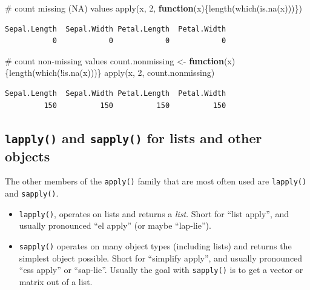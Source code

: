 \documentclass[
  13,
  letterpaper,
]{report}
\newenvironment{Shaded}{\begin{snugshade}}{\end{snugshade}}
\newcommand{\CommentTok}[1]{\textcolor[rgb]{0.37,0.37,0.37}{#1}}
\newcommand{\ControlFlowTok}[1]{\textcolor[rgb]{0.00,0.23,0.31}{\textbf{#1}}}
\newcommand{\DecValTok}[1]{\textcolor[rgb]{0.68,0.00,0.00}{#1}}
\newcommand{\FunctionTok}[1]{\textcolor[rgb]{0.28,0.35,0.67}{#1}}
\newcommand{\NormalTok}[1]{\textcolor[rgb]{0.00,0.23,0.31}{#1}}
\newcommand{\OtherTok}[1]{\textcolor[rgb]{0.00,0.23,0.31}{#1}}
\newcommand{\SpecialCharTok}[1]{\textcolor[rgb]{0.37,0.37,0.37}{#1}}
\providecommand{\tightlist}{%
  \setlength{\itemsep}{0pt}\setlength{\parskip}{0pt}}
\begin{document}
\begin{Shaded}
\begin{Highlighting}[]
\CommentTok{\# count missing (NA) values}
\FunctionTok{apply}\NormalTok{(x, }\DecValTok{2}\NormalTok{, }\ControlFlowTok{function}\NormalTok{(x)\{}\FunctionTok{length}\NormalTok{(}\FunctionTok{which}\NormalTok{(}\FunctionTok{is.na}\NormalTok{(x)))\})}
\end{Highlighting}
\end{Shaded}

\begin{verbatim}
Sepal.Length  Sepal.Width Petal.Length  Petal.Width 
           0            0            0            0 
\end{verbatim}

\begin{Shaded}
\begin{Highlighting}[]
\CommentTok{\# count non{-}missing values}
\NormalTok{count.nonmissing }\OtherTok{\textless{}{-}} \ControlFlowTok{function}\NormalTok{(x)\{}\FunctionTok{length}\NormalTok{(}\FunctionTok{which}\NormalTok{(}\SpecialCharTok{!}\FunctionTok{is.na}\NormalTok{(x)))\}}
\FunctionTok{apply}\NormalTok{(x, }\DecValTok{2}\NormalTok{, count.nonmissing)}
\end{Highlighting}
\end{Shaded}

\begin{verbatim}
Sepal.Length  Sepal.Width Petal.Length  Petal.Width 
         150          150          150          150 
\end{verbatim}

\subsection{\texorpdfstring{\texttt{lapply()} and \texttt{sapply()} for
lists and other
objects}{lapply() and sapply() for lists and other objects}}\label{lapply-and-sapply-for-lists-and-other-objects}

The other members of the \texttt{apply()} family that are most often
used are \texttt{lapply()} and \texttt{sapply()}.

\begin{itemize}
\tightlist
\item
  \texttt{lapply()}, operates on lists and returns a \emph{list}. Short
  for ``list apply'', and usually pronounced ``el apply'' (or maybe
  ``lap-lie'').
\item
  \texttt{sapply()} operates on many object types (including lists) and
  returns the simplest object possible. Short for ``simplify apply'',
  and usually pronounced ``ess apply'' or ``sap-lie''. Usually the goal
  with \texttt{sapply()} is to get a vector or matrix out of a list.
\end{itemize}
\end{document}
